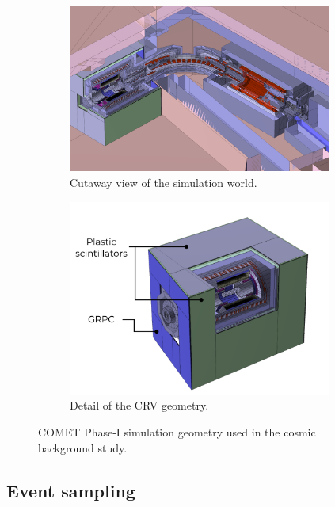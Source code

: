 \begin{figure}
    \centering
    \begin{subfigure}[b]{0.56\textwidth}
        \includegraphics[width=0.95\textwidth]{chapter5/geometry.png}
        \caption{Cutaway view of the simulation world.}
    \end{subfigure}
    \hfill
    \begin{subfigure}[b]{0.41\textwidth}
        \includegraphics[width=0.95\textwidth]{chapter5/crv_geom.pdf}
        \caption{Detail of the CRV geometry.}
    \end{subfigure}
    \caption{COMET Phase-I simulation geometry used in the cosmic background study.}
    \label{fig:bmc_geometry}
\end{figure}

\subsection{Event sampling}\label{sec:cosmic_event_sampling}

